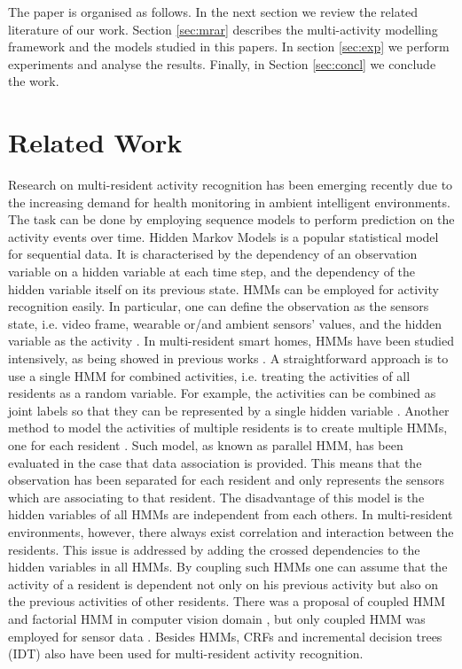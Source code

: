The paper is organised as follows. In the next section we review the
related literature of our work. Section \ref{sec:mrar} describes the
multi-activity modelling framework and the models studied in this
papers. In section \ref{sec:exp} we perform experiments and analyse the
results. Finally, in Section \ref{sec:concl} we conclude the work.


\section{Related Work}
Research on multi-resident activity recognition has been emerging
recently due to the increasing demand for health monitoring in ambient
intelligent environments. The task can be done by employing sequence
models to perform prediction on the activity events over time. Hidden
Markov Models \cite{Rabiner_1990} is a popular statistical model for
sequential data.  It is characterised by the dependency of an
observation variable on a hidden variable at each time step, and the
dependency of the hidden variable itself on its previous state. HMMs
can be employed for activity recognition easily. In particular, one
can define the observation as the sensors state, i.e. video frame,
wearable or/and ambient sensors' values, and the hidden variable as
the activity \cite{Kim_2010}. In multi-resident smart homes, HMMs have
been studied intensively, as being showed in previous works
\cite{Alemdar_2013,Chen_2014,Singla_2010,Cook_2012}. A straightforward
approach is to use a single HMM for combined activities, i.e. treating
the activities of all residents as a random variable. For example, the
activities can be combined as joint labels so that they can be
represented by a single hidden variable \cite{Chen_2014}. Another
method to model the activities of multiple residents is to create
multiple HMMs, one for each resident \cite{Chiang_2010}. Such model,
as known as parallel HMM, has been evaluated in the case that data
association is provided. This means that the observation has been
separated for each resident and only represents the sensors which are
associating to that resident. The disadvantage of this model is the
hidden variables of all HMMs are independent from each others. In
multi-resident environments, however, there always exist correlation
and interaction between the residents. This issue is addressed by
adding the crossed dependencies to the hidden variables in all
HMMs. By coupling such HMMs one can assume that the activity of a
resident is dependent not only on his previous activity but also on
the previous activities of other residents.  There was a proposal of
coupled HMM and factorial HMM in computer vision domain
\cite{Brand_1997}, but only coupled HMM was employed for sensor data
\cite{Chiang_2010}. Besides HMMs, CRFs \cite{Crandall_2008,Hsu_2010}
and incremental decision trees (IDT) \cite{Prossegger_2014} also have
been used for multi-resident activity recognition.


